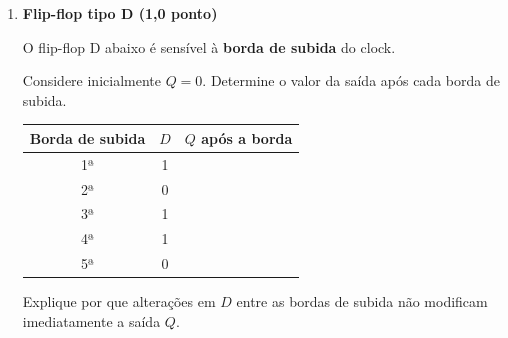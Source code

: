 \documentclass[a4paper,12pt]{article}
\begin{document}
\begin{enumerate}[
    leftmargin=0.8cm,
    label=\textbf{\arabic*.},
    itemsep=0.7cm
]
O que ocorre quando $S=1$ e $R=1$?

\vspace{1.3cm}


\item \textbf{Flip-flop tipo D \hfill (1,0 ponto)}

O flip-flop D abaixo é sensível à \textbf{borda de subida} do clock.

\begin{center}
\end{center}

Considere inicialmente $Q=0$. Determine o valor da saída após cada borda de
subida.

\begin{center}
\renewcommand{\arraystretch}{1.5}

\begin{tabular}{|c|c|c|}
\hline
\textbf{Borda de subida} & $D$ & $Q$ após a borda \\
\hline
1ª & 1 & \\
\hline
2ª & 0 & \\
\hline
3ª & 1 & \\
\hline
4ª & 1 & \\
\hline
5ª & 0 & \\
\hline
\end{tabular}
\end{center}

Explique por que alterações em $D$ entre as bordas de subida não modificam
imediatamente a saída $Q$.

\vspace{1.2cm}


\end{enumerate}
\end{document}
